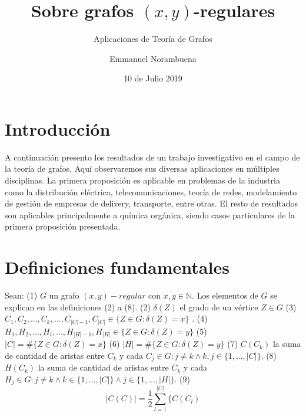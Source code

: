 \documentclass{article}
\title{Sobre grafos $(x,y)$-regulares}
\subtitle{Aplicaciones de Teoría de Grafos}
\author{Emmanuel Norambuena}
\date{10 de Julio 2019}
\begin{document}
\maketitle

\tableofcontents

\section{Introducción}
A continuación presento los resultados de un trabajo investigativo en el campo de la teoría de grafos. Aquí observaremos sus diversas aplicaciones en múltiples disciplinas. La primera proposición es aplicable en problemas de la industria como la distribución eléctrica, telecomunicaciones, teoría de redes, modelamiento de gestión de empresas de delivery, transporte, entre otras. El resto de resultados son aplicables principalmente a química orgánica, siendo casos particulares de la primera proposición presentada.

\section{Definiciones fundamentales}
Sean:\newline
(1) $G$ un grafo $(x,y)-regular$ con $x,y \in \mathbb{N}$.  Los elementos de $G$ se explican en las definiciones (2) a (8).\newline
(2) $\delta(Z)$ el grado de un vértice $Z \in G$\newline
(3) $C_1,C_2,...,C_k,...,C_{|C|-1},C_{|C|} \in \{Z\in G:$$\delta(Z)=x\}$   .\newline
(4) $H_1,H_2,...,H_i,...,H_{|H|-1},H_{|H|} \in \{Z\in G:$$\delta(Z)=y\}$ \newline
(5) $|C|=\#\{Z\in G:\delta(Z)=x\}$\newline
(6) $|H|=\#\{Z\in G:\delta(Z)=y\}$\newline
(7) $C(C_k)$ la suma de cantidad de aristas entre $C_k$ y cada $C_j \in G :j\not =k \wedge k,j  \in \{1,...,|C|\}$.\newline
(8) $H(C_k)$ la suma de cantidad de aristas entre $C_k$ y cada $H_j \in G :j\not =k \wedge k \in \{1,...,|C|\} \wedge j \in \{1,...,|H|\}$.\newline
(9) $$|C(C)|=\frac{1}{2}\sum_{l=1}^{|C|}\{ C(C_l)$$
\end{document}
